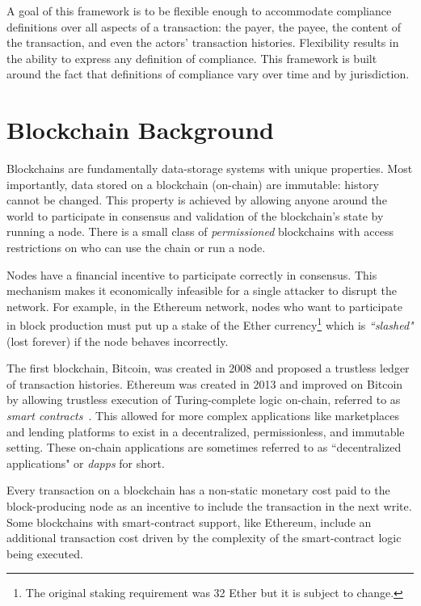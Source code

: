 \documentclass[9pt]{extreport}
\begin{document}
A goal of this framework is to be flexible enough to accommodate compliance definitions over all aspects of a transaction: the payer, the payee, the content of the transaction, and even the actors' transaction histories.  Flexibility results in the ability to express any definition of compliance.  This framework is built around the fact that definitions of compliance vary over time and by jurisdiction.


\section{Blockchain Background}
Blockchains are fundamentally data-storage systems with unique properties.  Most importantly, data stored on a blockchain (on-chain) are \rm{immutable}: history cannot be changed.  This property is achieved by allowing anyone  around the world to participate in consensus and validation of the blockchain's state by running a node.  There is a small class of \textit{permissioned} blockchains with access restrictions on who can use the chain or run a node.

Nodes have a financial incentive to participate correctly in consensus.  This mechanism makes it economically infeasible for a single attacker to disrupt the network.  For example, in the Ethereum network, nodes who want to participate in block production must put up a stake of the Ether currency\footnote{The original staking requirement was 32 Ether but it is subject to change.} which is \textit{``slashed"} (lost forever) if the node behaves incorrectly\cite{eip2982}.

The first blockchain, Bitcoin, was created in 2008 and proposed a trustless ledger of transaction histories\cite{Bitcoin}.  Ethereum was created in 2013 and improved on Bitcoin by allowing trustless execution of Turing-complete logic on-chain, referred to as \textit{smart contracts}~\cite{Buterin13}.  This allowed for more complex applications like marketplaces and lending platforms to exist in a decentralized, permissionless, and immutable setting.  These on-chain applications are sometimes referred to as ``decentralized applications" or \textit{dapps} for short.

Every transaction on a blockchain has a non-static monetary cost paid to the block-producing node as an incentive to include the transaction in the next write.  Some blockchains with smart-contract support, like Ethereum, include an additional transaction cost driven by the complexity of the smart-contract logic being executed.  
\end{document}
